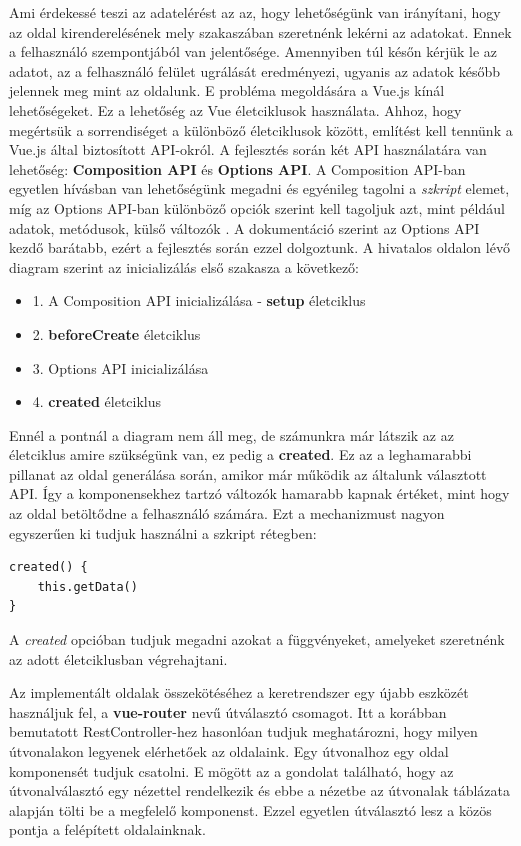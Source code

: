 \documentclass[12pt]{article}
\begin{document}
Ami érdekessé teszi az adatelérést az az, hogy lehetőségünk van irányítani, hogy az oldal kirenderelésének mely szakaszában szeretnénk lekérni az adatokat. Ennek a felhasználó szempontjából van jelentősége. Amennyiben túl későn kérjük le az adatot, az a felhasználó felület ugrálását eredményezi, ugyanis az adatok később jelennek meg mint az oldalunk. E probléma megoldására a Vue.js kínál lehetőségeket. Ez a lehetőség az Vue életciklusok használata. Ahhoz, hogy megértsük a sorrendiséget a különböző életciklusok között, említést kell tennünk a Vue.js által biztosított API-okról. A fejlesztés során két API használatára van lehetőség: \textbf{Composition API} és \textbf{Options API}. A Composition API-ban egyetlen hívásban van lehetőségünk megadni és egyénileg tagolni a \textit{szkript} elemet, míg az Options API-ban különböző opciók szerint kell tagoljuk azt, mint például adatok, metódusok, külső változók \cite{API_STYLES}. A dokumentáció szerint az Options API kezdő barátabb, ezért a fejlesztés során ezzel dolgoztunk. A hivatalos oldalon lévő diagram szerint \cite{VUE_LIFECYCLE} az inicializálás első szakasza a következő:
\begin{itemize}
\item 1. A Composition API inicializálása - \textbf{setup} életciklus
\item 2. \textbf{beforeCreate} életciklus
\item 3. Options API inicializálása
\item 4. \textbf{created} életciklus
\end{itemize}

Ennél a pontnál a diagram nem áll meg, de számunkra már látszik az az életciklus amire szükségünk van, ez pedig a \textbf{created}. Ez az a leghamarabbi pillanat az oldal generálása során, amikor már működik az általunk választott API. Így a komponensekhez tartzó változók  hamarabb kapnak értéket, mint hogy az oldal betöltődne a felhasználó számára. Ezt a mechanizmust nagyon egyszerűen ki tudjuk használni a szkript rétegben:
\begin{verbatim}
created() {
    this.getData()
}
\end{verbatim}

A \textit{created} opcióban tudjuk megadni azokat a függvényeket, amelyeket szeretnénk az adott életciklusban végrehajtani.

\bigskip

Az implementált oldalak összekötéséhez a keretrendszer egy újabb eszközét használjuk fel, a \textbf{vue-router} nevű útválasztó csomagot. Itt a korábban bemutatott RestController-hez hasonlóan tudjuk meghatározni, hogy milyen útvonalakon legyenek elérhetőek az oldalaink. Egy útvonalhoz egy oldal komponensét tudjuk csatolni. E mögött az a gondolat található, hogy az útvonalválasztó egy nézettel rendelkezik és ebbe a nézetbe az útvonalak táblázata alapján tölti be a megfelelő komponenst. Ezzel egyetlen útválasztó lesz a közös pontja a felépített oldalainknak.
\end{document}
